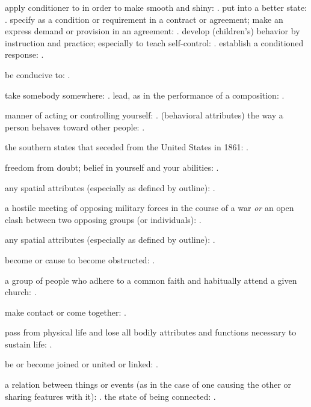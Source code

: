   apply conditioner to in order to make smooth and shiny: . put into a better state: . specify as a condition or requirement in a contract or agreement; make an express demand or provision in an agreement: . develop (children's) behavior by instruction and practice; especially to teach self-control: . establish a conditioned response: .

  be conducive to: .

  take somebody somewhere: . lead, as in the performance of a composition: .

  manner of acting or controlling yourself: . (behavioral attributes) the way a person behaves toward other people: .

  the southern states that seceded from the United States in 1861: .

  freedom from doubt; belief in yourself and your abilities: .

  any spatial attributes (especially as defined by outline): .

  a hostile meeting of opposing military forces in the course of a war \textit{or} an open clash between two opposing groups (or individuals): .

  any spatial attributes (especially as defined by outline): .

  become or cause to become obstructed: .

  a group of people who adhere to a common faith and habitually attend a given church: .

  make contact or come together: .

  pass from physical life and lose all bodily attributes and functions necessary to sustain life: .

  be or become joined or united or linked: .

  a relation between things or events (as in the case of one causing the other or sharing features with it): . the state of being connected: .

